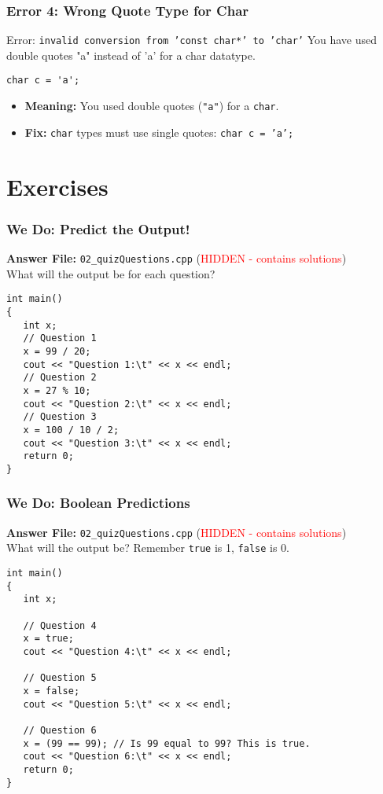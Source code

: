 \documentclass{beamer}
\begin{document}
\begin{frame}[fragile]
\frametitle{Error 4: Wrong Quote Type for Char}
\begin{alertblock}{Error: \texttt{invalid conversion from 'const char*' to 'char'}}
You have used double quotes "a" instead of 'a' for a char datatype.
\end{alertblock}
\begin{verbatim}
char c = 'a';
\end{verbatim}
\begin{itemize}
    \item \textbf{Meaning:} You used double quotes (\texttt{"a"}) for a \texttt{char}.
    \item \textbf{Fix:} \texttt{char} types must use single quotes: \texttt{char c = 'a';}
\end{itemize}
\end{frame}

\section{Exercises}

\begin{frame}[fragile]
\frametitle{We Do: Predict the Output!}
\textbf{Answer File:} \texttt{02\_quizQuestions.cpp} (\textcolor{red}{HIDDEN - contains solutions})
\\What will the output be for each question?\pause
\begin{verbatim}
int main()
{
   int x;
   // Question 1
   x = 99 / 20;
   cout << "Question 1:\t" << x << endl;
   // Question 2
   x = 27 % 10;
   cout << "Question 2:\t" << x << endl;
   // Question 3
   x = 100 / 10 / 2;
   cout << "Question 3:\t" << x << endl;
   return 0;
}
\end{verbatim}
\end{frame}

\begin{frame}[fragile]
\frametitle{We Do: Boolean Predictions}
\textbf{Answer File:} \texttt{02\_quizQuestions.cpp} (\textcolor{red}{HIDDEN - contains solutions})
\\What will the output be? Remember \texttt{true} is 1, \texttt{false} is 0.\pause
\begin{verbatim}
int main()
{
   int x;

   // Question 4
   x = true;
   cout << "Question 4:\t" << x << endl;
   
   // Question 5
   x = false;
   cout << "Question 5:\t" << x << endl;
   
   // Question 6
   x = (99 == 99); // Is 99 equal to 99? This is true.
   cout << "Question 6:\t" << x << endl;
   return 0;
}
\end{verbatim}
\end{frame}
\end{document}
